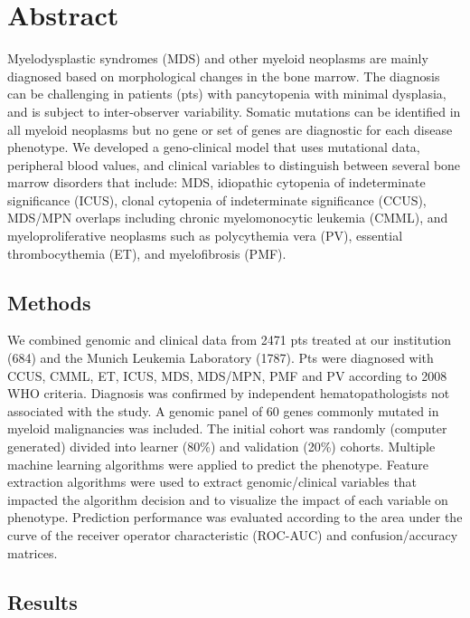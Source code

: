 \section{Abstract}%

Myelodysplastic syndromes (MDS) and other myeloid neoplasms are mainly diagnosed based on morphological changes in the bone marrow. The diagnosis can be challenging in patients (pts) with pancytopenia with minimal dysplasia, and is subject to inter-observer variability. Somatic mutations can be identified in all myeloid neoplasms but no gene or set of genes are diagnostic for each disease phenotype. 
We developed a geno-clinical model that uses mutational data, peripheral blood values, and clinical variables to distinguish between several bone marrow disorders that include: MDS, idiopathic cytopenia of indeterminate significance (ICUS), clonal cytopenia of indeterminate significance (CCUS), MDS/MPN overlaps including chronic myelomonocytic leukemia (CMML), and myeloproliferative neoplasms such as polycythemia vera (PV), essential thrombocythemia (ET), and myelofibrosis (PMF).


\subsection{Methods}%

We combined genomic and clinical data from 2471 pts treated at our institution (684) and the Munich Leukemia Laboratory (1787). Pts were diagnosed with CCUS, CMML, ET, ICUS, MDS, MDS/MPN, PMF and PV according to 2008 WHO criteria. Diagnosis was confirmed by independent hematopathologists not associated with the study. A genomic panel of 60 genes commonly mutated in myeloid malignancies was included. The initial cohort was randomly (computer generated) divided into learner (80\%) and validation (20\%) cohorts. Multiple machine learning algorithms were applied to predict the phenotype. Feature extraction algorithms were used to extract genomic/clinical variables that impacted the algorithm decision and to visualize the impact of each variable on phenotype. Prediction performance was evaluated according to the area under the curve of the receiver operator characteristic (ROC-AUC) and confusion/accuracy matrices.


\subsection{Results}%

